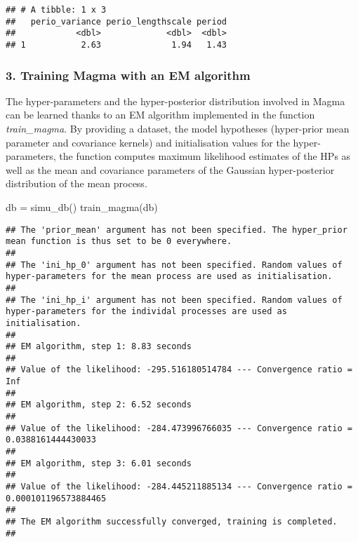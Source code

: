 \documentclass[
]{article}
\newenvironment{Shaded}{\begin{snugshade}}{\end{snugshade}}
\newcommand{\FunctionTok}[1]{\textcolor[rgb]{0.00,0.00,0.00}{#1}}
\newcommand{\NormalTok}[1]{#1}
\newcommand{\OtherTok}[1]{\textcolor[rgb]{0.56,0.35,0.01}{#1}}
\begin{document}
\begin{verbatim}
## # A tibble: 1 x 3
##   perio_variance perio_lengthscale period
##            <dbl>             <dbl>  <dbl>
## 1           2.63              1.94   1.43
\end{verbatim}

\hypertarget{training-magma-with-an-em-algorithm}{%
\subsubsection{3. Training Magma with an EM
algorithm}\label{training-magma-with-an-em-algorithm}}

The hyper-parameters and the hyper-posterior distribution involved in
Magma can be learned thanks to an EM algorithm implemented in the
function \emph{train\_magma}. By providing a dataset, the model
hypotheses (hyper-prior mean parameter and covariance kernels) and
initialisation values for the hyper-parameters, the function computes
maximum likelihood estimates of the HPs as well as the mean and
covariance parameters of the Gaussian hyper-posterior distribution of
the mean process.

\begin{Shaded}
\begin{Highlighting}[]
\NormalTok{db }\OtherTok{=} \FunctionTok{simu\_db}\NormalTok{()}
\FunctionTok{train\_magma}\NormalTok{(db)}
\end{Highlighting}
\end{Shaded}

\begin{verbatim}
## The 'prior_mean' argument has not been specified. The hyper_prior mean function is thus set to be 0 everywhere.
##  
## The 'ini_hp_0' argument has not been specified. Random values of hyper-parameters for the mean process are used as initialisation.
##  
## The 'ini_hp_i' argument has not been specified. Random values of hyper-parameters for the individal processes are used as initialisation.
##  
## EM algorithm, step 1: 8.83 seconds 
##  
## Value of the likelihood: -295.516180514784 --- Convergence ratio = Inf
##  
## EM algorithm, step 2: 6.52 seconds 
##  
## Value of the likelihood: -284.473996766035 --- Convergence ratio = 0.0388161444430033
##  
## EM algorithm, step 3: 6.01 seconds 
##  
## Value of the likelihood: -284.445211885134 --- Convergence ratio = 0.000101196573884465
##  
## The EM algorithm successfully converged, training is completed. 
## 
\end{verbatim}
\end{document}
